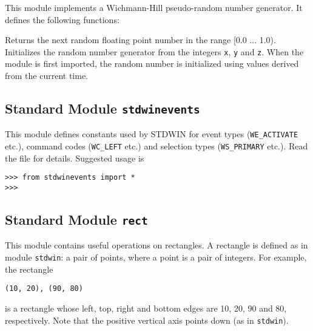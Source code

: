 This module implements a Wichmann-Hill pseudo-random number generator.
It defines the following functions:
\begin{description}
Returns the next random floating point number in the range [0.0 ... 1.0).
Initializes the random number generator from the integers
{\tt x},
{\tt y}
and
{\tt z}.
When the module is first imported, the random number is initialized
using values derived from the current time.
\end{description}

\subsection{Standard Module {\tt stdwinevents}}

This module defines constants used by STDWIN for event types
({\tt WE\_ACTIVATE} etc.), command codes ({\tt WC\_LEFT} etc.)
and selection types ({\tt WS\_PRIMARY} etc.).
Read the file for details.
Suggested usage is
\bcode\begin{verbatim}
>>> from stdwinevents import *
>>> 
\end{verbatim}\ecode

\subsection{Standard Module {\tt rect}}

This module contains useful operations on rectangles.
A rectangle is defined as in module
{\tt stdwin}:
a pair of points, where a point is a pair of integers.
For example, the rectangle
\bcode\begin{verbatim}
(10, 20), (90, 80)
\end{verbatim}\ecode
is a rectangle whose left, top, right and bottom edges are 10, 20, 90
and 80, respectively.
Note that the positive vertical axis points down (as in
{\tt stdwin}).

